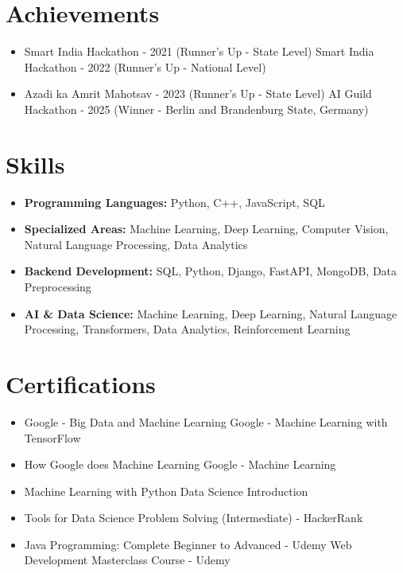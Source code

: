 \documentclass[a4paper,10pt]{article}
\begin{document}
\section*{Achievements}
\begin{itemize}
\item Smart India Hackathon - 2021 (Runner's Up - State Level) \hfill Smart India Hackathon - 2022 (Runner's Up - National Level)
\item Azadi ka Amrit Mahotsav - 2023 (Runner's Up - State Level) \hfill AI Guild Hackathon - 2025 (Winner - Berlin and Brandenburg State, Germany)
\end{itemize}

\section*{Skills}
\begin{itemize}
  \item \textbf{Programming Languages:} Python, C++, JavaScript, SQL
  \item \textbf{Specialized Areas:} Machine Learning, Deep Learning, Computer Vision, Natural Language Processing, Data Analytics
  \item \textbf{Backend Development:} SQL, Python, Django, FastAPI, MongoDB, Data Preprocessing
  \item \textbf{AI \& Data Science:} Machine Learning, Deep Learning, Natural Language Processing, Transformers, Data Analytics, Reinforcement Learning
\end{itemize}

\section*{Certifications}
\begin{itemize}
\item Google - Big Data and Machine Learning \hfill Google - Machine Learning with TensorFlow
\item How Google does Machine Learning \hfill Google - Machine Learning
\item Machine Learning with Python \hfill Data Science Introduction
\item Tools for Data Science \hfill Problem Solving (Intermediate) - HackerRank
\item Java Programming: Complete Beginner to Advanced - Udemy \hfill Web Development Masterclass Course - Udemy
\end{itemize}
\end{document}

